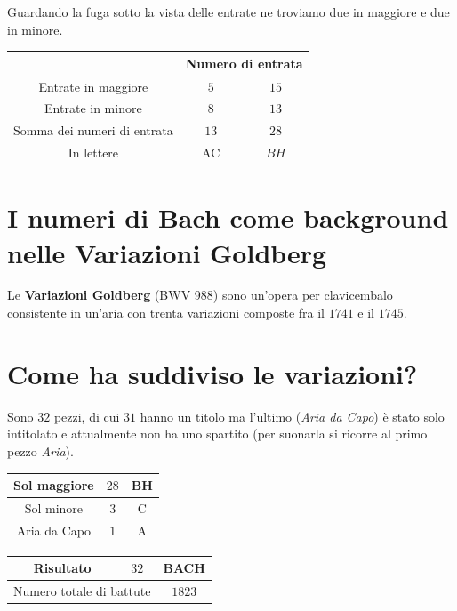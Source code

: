 \documentclass[12pt]{article}
\begin{document}
Guardando la fuga sotto la vista delle entrate ne troviamo due in maggiore e due in minore.

\begin{center}
\begin{tabular}{|c|c|c|}
  \hline
  & \multicolumn{2}{c|}{Numero di entrata
} \\
  \hline
  Entrate in maggiore & $5$ & $15$\\ 
  \hline
  Entrate in minore & $8$ & $13$\\ 
  \hline
  Somma dei numeri di entrata & $13$ & $28$\\ 
  \hline
  In lettere & AC & $BH$\\ 
  \hline
\end{tabular}
\end{center}

\section{I numeri di Bach come background nelle Variazioni Goldberg
}
Le \textbf{Variazioni Goldberg} (BWV $988$) sono un'opera per clavicembalo consistente in un'aria con
trenta variazioni composte fra il $1741$ e il $1745$.

\section{Come ha \textbf{suddiviso} le variazioni?}
Sono $32$ pezzi, di cui $31$ hanno un titolo ma l’ultimo (\textit{Aria da Capo}) è stato solo intitolato e
attualmente non ha uno spartito (per suonarla si ricorre al primo pezzo \textit{Aria}).

\begin{center}
\begin{tabular}{|c|c|c|}
  \hline
  Sol maggiore & $28$ & BH \\
  \hline
  Sol minore & $3$ & C\\ 
  \hline
  Aria da Capo & $1$ & A\\
  \hline
\end{tabular}
\end{center}

\begin{center}
\begin{tabular}{|c|c|c|}
  \hline
  \textbf{Risultato} & $32$ & BACH \\
  \hline
  \multicolumn{2}{|c|}{Numero totale di battute} & $1823$\\ 
  \hline
\end{tabular}
\end{center}
\end{document}
